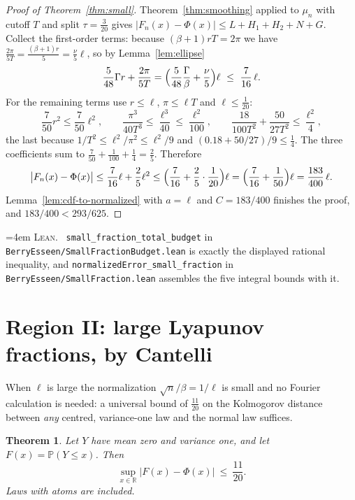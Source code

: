 \documentclass[10pt,a4paper]{article}
\theoremstyle{plain}
\newtheorem{theorem}{Theorem}[section]
\theoremstyle{definition}
\newcommand{\R}{\mathbb{R}}
\newcommand{\PR}{\mathbb{P}}
\newcommand{\lean}[1]{\texttt{#1}}
\newcommand{\file}[1]{\texttt{#1}}
\newenvironment{leanref}%
  {\par\addvspace{3pt}\begingroup\sloppy\emergencystretch=4em
   \noindent\footnotesize\textsc{Lean.}\ \ignorespaces}%
  {\par\endgroup\addvspace{3pt}}
\begin{document}
\begin{proof}[Proof of Theorem~\ref{thm:small}]
Theorem~\ref{thm:smoothing} applied to $\mu_n$ with cutoff $T$ and split
$\tau=\tfrac3{20}$ gives $|F_n(x)-\Phi(x)|\le L+H_1+H_2+N+G$. Collect the
first-order terms: because $(\beta+1)rT=2\pi$ we have
$\tfrac{2\pi}{5T}=\tfrac{(\beta+1)r}{5}=\tfrac\nu5\ell$, so by
Lemma~\ref{lem:ellipse}
\[
  \frac5{48}\Gamma r+\frac{2\pi}{5T}
  = \Bigl(\frac5{48}\frac\Gamma\beta+\frac\nu5\Bigr)\ell
  \ \le\ \frac7{16}\,\ell .
\]
For the remaining terms use $r\le\ell$, $\pi\le\ell T$ and
$\ell\le\tfrac1{20}$:
\[
  \frac7{50}r^2\le\frac7{50}\ell^2,
  \qquad
  \frac{\pi^3}{40T^3}\le\frac{\ell^3}{40}\le\frac{\ell^2}{100},
  \qquad
  \frac{18}{100T^2}+\frac{50}{27T^2}\le\frac{\ell^2}{4},
\]
the last because $1/T^2\le\ell^2/\pi^2\le\ell^2/9$ and
$(0.18+50/27)/9\le\tfrac14$. The three coefficients sum to
$\tfrac7{50}+\tfrac1{100}+\tfrac14=\tfrac25$. Therefore
\[
  \bigl|F_n(x)-\Phi(x)\bigr| \le \frac7{16}\ell+\frac25\ell^2
  \le \Bigl(\frac7{16}+\frac25\cdot\frac1{20}\Bigr)\ell
  = \Bigl(\frac7{16}+\frac1{50}\Bigr)\ell = \frac{183}{400}\,\ell .
\]
Lemma~\ref{lem:cdf-to-normalized} with $a=\ell$ and $C=183/400$ finishes the
proof, and $183/400<293/625$.
\end{proof}

\begin{leanref}
\lean{small\_fraction\_total\_budget} in
\file{BerryEsseen/SmallFractionBudget.lean} is exactly the displayed rational
inequality, and \lean{normalizedError\_small\_fraction} in
\file{BerryEsseen/SmallFraction.lean} assembles the five integral bounds with
it.
\end{leanref}

\section{Region II: large Lyapunov fractions, by Cantelli}
\label{sec:large}

When $\ell$ is large the normalization $\sqrt n/\beta=1/\ell$ is small and no
Fourier calculation is needed: a universal bound of $\tfrac{11}{20}$ on the
Kolmogorov distance between \emph{any} centred, variance-one law and the normal
law suffices.

\begin{theorem}\label{thm:cantelli}
Let $Y$ have mean zero and variance one, and let $F(x)=\PR(Y\le x)$. Then
\[
  \boxed{\ \sup_{x\in\R}\bigl|F(x)-\Phi(x)\bigr| \ \le\ \frac{11}{20}. \ }
\]
Laws with atoms are included.
\end{theorem}
\end{document}
